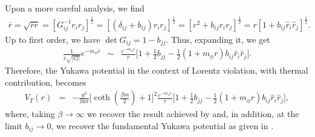 \documentclass[11pt,showpacs,preprintnumbers,amsmath,amssymb,prd,nofootinbib,superscriptaddress]{revtex4-2}
\begin{document}
Upon a more careful analysis, we find
\begin{eqnarray}
    \bar{r}=\sqrt{\bar{r}\bar{r}}=\left[G_{ij}^{-1}r_ir_j\right]^{\frac{1}{2}}=\left[\left(\delta_{ij}+b_{ij}\right)r_ir_j\right]^{\frac{1}{2}}=\left[r^2+b_{ij}r_ir_j\right]^{\frac{1}{2}}=r\left[1+b_{ij}\hat{r}_i\hat{r}_j\right]^{\frac{1}{2}}.
\end{eqnarray}
Up to first order, we have $\det{G_{ij}} = 1 - b_{jj}$. Thus, expanding it, we get
\begin{eqnarray}
    \frac{1}{\bar{r}\sqrt{|G|}}e^{-m_\phi\bar{r}}&\sim&%
    \frac{e^{-m_\phi r}}{r}\biggl[1+\frac{1}{2}b_{jj}-\frac{1}{2}(1+m_\phi r)b_{ij}\hat{r}_i\hat{r}_j\biggr].
\end{eqnarray}
Therefore, the Yukawa potential in the context of Lorentz violation, with thermal contribution,  becomes
\begin{eqnarray}
    V_T(r)
    &=&-\frac{g^2}{16\pi}\biggr[\coth{\left(\frac{\beta m}{2}\right)}+1\biggl]^2\frac{e^{-m_\phi r}}{r}\biggl[1+\frac{1}{2}b_{jj}-\frac{1}{2}(1+m_\phi r)b_{ij}\hat{r}_i\hat{r}_j\biggr],\label{eq19}
\end{eqnarray}
where, taking $\beta \to \infty$ we recover the result achieved by \cite{altschul} and, in addition, at the limit $b_{ij} \to 0$, we recover the fundamental Yukawa potential as given in \cite{peskin}.
\end{document}
